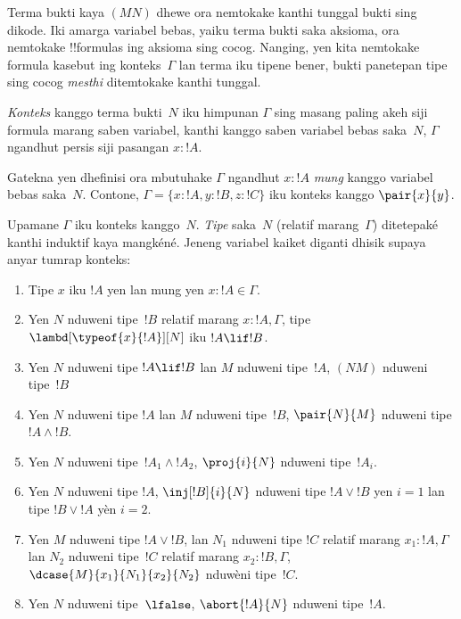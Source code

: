\documentclass[../../../include/open-logic-section]{subfiles}
\begin{document}


Terma bukti kaya $(MN)$ dhewe ora nemtokake kanthi tunggal bukti sing
dikode. Iki amarga variabel bebas, yaiku terma bukti saka aksioma,
ora nemtokake !!{formula}s ing aksioma sing cocog. Nanging, yen kita
nemtokake formula kasebut ing konteks~$\Gamma$ lan terma iku tipene
bener, bukti panetepan tipe sing cocog \emph{mesthi} ditemtokake
kanthi tunggal.

\begin{defn}
\emph{Konteks} kanggo terma bukti~$N$ iku himpunan $\Gamma$ sing
masang paling akeh siji formula marang saben variabel, kanthi kanggo
saben variabel bebas saka~$N$, $\Gamma$ ngandhut persis siji pasangan
$x : !A$.
\end{defn}

Gatekna yen dhefinisi ora mbutuhake $\Gamma$ ngandhut $x:!A$
\emph{mung} kanggo variabel bebas saka~$N$. Contone,
$\Gamma = \{x:!A, y:!B, z:!C\}$ iku konteks kanggo $\pair{x}{y}$.

\begin{defn}
  Upamane $\Gamma$ iku konteks kanggo~$N$. \emph{Tipe} saka~$N$
  (relatif marang~$\Gamma$) ditetepaké kanthi induktif kaya mangkéné.
  Jeneng variabel kaiket diganti dhisik supaya anyar tumrap konteks:
  \begin{enumerate}
  \item Tipe $x$ iku $!A$ yen lan mung yen $x:!A \in \Gamma$.
  \item Yen $N$ nduweni tipe~$!B$ relatif marang $x:!A, \Gamma$, tipe $\lambd[\typeof{x}{!A}][N]$ iku $!A \lif !B$.
  \item Yen $N$ nduweni tipe $!A \lif !B$ lan $M$ nduweni tipe~$!A$,
    $(NM)$ nduweni tipe~$!B$
  \item Yen $N$ nduweni tipe $!A$ lan $M$ nduweni tipe~$!B$,
    $\pair{N}{M}$ nduweni tipe $!A \land !B$.
  \item Yen $N$ nduweni tipe~$!A_1 \land !A_2$, $\proj{i}{N}$ nduweni tipe~$!A_i$.
  \item Yen $N$ nduweni tipe $!A$,
    $\inj[!B]{i}{N}$ nduweni tipe $!A \lor !B$ yen $i=1$ lan tipe
    $!B \lor !A$ yèn $i=2$.
  \item Yen $M$ nduweni tipe $!A \lor !B$, lan $N_1$ nduweni tipe
    $!C$ relatif marang $x_1:!A, \Gamma$ lan $N_2$ nduweni tipe~$!C$
    relatif marang $x_2:!B, \Gamma$, $\dcase{M}{x_1}{N_1}{x_2}{N_2}$
    nduwèni tipe~$!C$.
  \item Yen $N$ nduweni tipe~$\lfalse$,
    $\abort{!A}{N}$ nduweni tipe~$!A$.
  \end{enumerate}
\end{defn}
\end{document}

